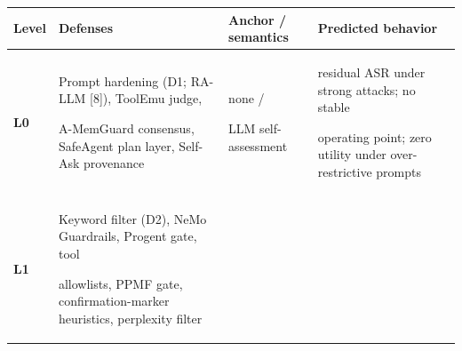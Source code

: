 \documentclass[

]{article}
\newcounter{none} %
\begin{document}
{\def\LTcaptype{none} %

\begin{longtable}[]{@{}

  >{\raggedright\arraybackslash}p{}

  >{\raggedright\arraybackslash}p{}

  >{\raggedright\arraybackslash}p{}

  >{\raggedright\arraybackslash}p{}@{}}

\toprule\noalign{}

\begin{minipage}[b]{\linewidth}\raggedright

Level

\end{minipage} & \begin{minipage}[b]{\linewidth}\raggedright

Defenses

\end{minipage} & \begin{minipage}[b]{\linewidth}\raggedright

Anchor / semantics

\end{minipage} & \begin{minipage}[b]{\linewidth}\raggedright

Predicted behavior

\end{minipage} \\

\midrule\noalign{}

\endhead

\bottomrule\noalign{}

\endlastfoot

\textbf{L0} & Prompt hardening (D1; RA-LLM {[}8{]}), ToolEmu judge,

A-MemGuard consensus, SafeAgent plan layer, Self-Ask provenance & none /

LLM self-assessment & residual ASR under strong attacks; no stable

operating point; zero utility under over-restrictive prompts \\

\textbf{L1} & Keyword filter (D2), NeMo Guardrails, Progent gate, tool

allowlists, PPMF gate, confirmation-marker heuristics, perplexity filter


\end{longtable}}
\end{document}
